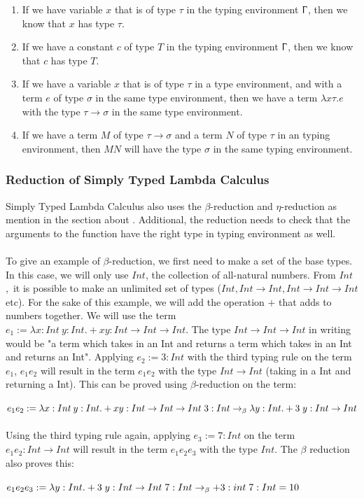 \begin{enumerate}
    \item If we have variable $x$ that is of type $\tau$ in the typing environment $\Upgamma$, then we know that $x$ has type $\tau$.
    \item If we have a constant $c$ of type $T$ in the typing environment $\Upgamma$, then we know that $c$ has type $T$.
    \item If we have a variable $x$ that is of type $\tau$ in a type environment, and with a term $e$ of type $\sigma$ in the same type environment, then we have a term $\lambda x\tau .e$ with the type $\tau \rightarrow \sigma$ in the same type environment.
    \item If we have a term $M$ of type $\tau \rightarrow \sigma$ and a term $N$ of type $\tau$ in an typing environment, then $M N$ will have the type $\sigma$ in the same typing environment.
\end{enumerate}

\subsubsection{Reduction of Simply Typed Lambda Calculus}
Simply Typed Lambda Calculus also uses the $\beta$-reduction and $\eta$-reduction as mention in the section about . 
Additional, the reduction needs to check that the arguments to the function have 
the right type in typing environment as well. 
\\ \\
To give an example of $\beta$-reduction, we first need to make a set of the base types. In this case, we will only use $Int$, the collection of all-natural numbers. 
From $Int$, it is possible to make an unlimited set of types ($Int, Int \rightarrow Int, Int \rightarrow Int \rightarrow Int$ etc).
For the sake of this example, we will add the operation $+$ that adds to numbers together.
We will use the term $e_1:= \lambda x:Int\: y:Int. + x y:Int \rightarrow Int \rightarrow Int$. The type $Int \rightarrow Int \rightarrow Int$ in writing would be "a term
which takes in an Int and returns a term which takes in an Int and returns an Int". 
Applying $e_2 := 3:Int$ with the third typing rule on 
the term $e_1$, $e_1 e_2$ will result in the term  
$e_1 e_2$ with the type $Int \rightarrow Int$ (taking in a Int and returning a Int). This can be proved using $\beta$-reduction on the term:
\\ \\
$e_1 e_2 := \lambda x:Int\: y:Int. + x y:Int \rightarrow Int \rightarrow Int\; 3:Int 
\newline\rightarrow_\beta \lambda y:Int. + 3\; y: Int \rightarrow Int$
\\ \\
Using the third typing rule again, applying 
$e_3 := 7:Int$ on the term $e_1 e_2:Int \rightarrow Int$ will result in the term $e_1 e_2 e_3$ with the type $Int$.
The $\beta$ reduction also proves this: 
\\ \\
$e_1 e_2 e_3 := \lambda y:Int. + 3\; y: Int \rightarrow Int \; 7:Int
\newline \rightarrow_\beta + 3:int \; 7:Int = 10$

